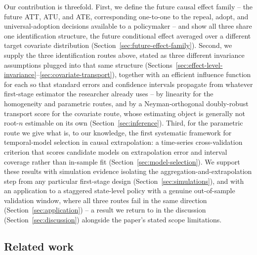 \documentclass{article}
\begin{document}
Our contribution is threefold. First, we define the future causal effect family -- the future ATT, ATU, and ATE, corresponding one-to-one to the repeal, adopt, and universal-adoption decisions available to a policymaker -- and show all three share one identification structure, the future conditional effect averaged over a different target covariate distribution (Section~\ref{sec:future-effect-family}). Second, we supply the three identification routes above, stated as three different invariance assumptions plugged into that same structure (Sections~\ref{sec:effect-level-invariance}--\ref{sec:covariate-transport}), together with an efficient influence function for each so that standard errors and confidence intervals propagate from whatever first-stage estimator the researcher already uses -- by linearity for the homogeneity and parametric routes, and by a Neyman-orthogonal doubly-robust transport score for the covariate route, whose estimating object is generally not root-$n$ estimable on its own (Section~\ref{sec:inference}). Third, for the parametric route we give what is, to our knowledge, the first systematic framework for temporal-model selection in causal extrapolation: a time-series cross-validation criterion that scores candidate models on extrapolation error and interval coverage rather than in-sample fit (Section~\ref{sec:model-selection}). We support these results with simulation evidence isolating the aggregation-and-extrapolation step from any particular first-stage design (Section~\ref{sec:simulations}), and with an application to a staggered state-level policy with a genuine out-of-sample validation window, where all three routes fail in the same direction (Section~\ref{sec:application}) -- a result we return to in the discussion (Section~\ref{sec:discussion}) alongside the paper's stated scope limitations.

\subsection{Related work}
\end{document}
